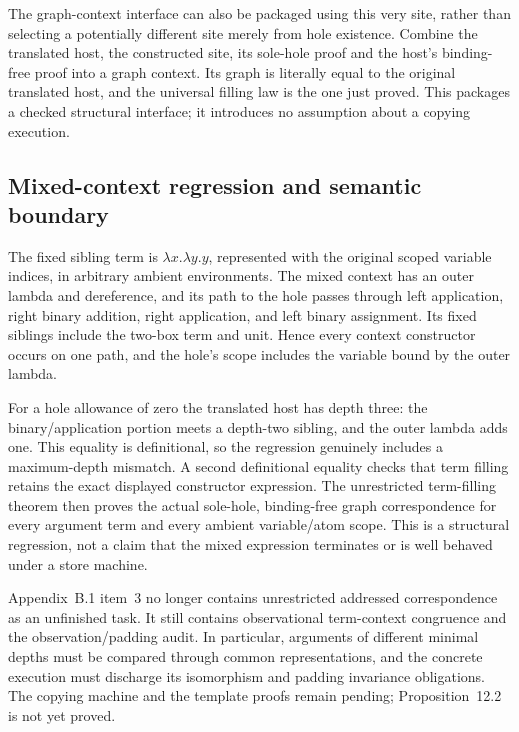 The graph-context interface can also be packaged using this very site, rather
than selecting a potentially different site merely from hole existence.
Combine the translated host, the constructed site, its sole-hole proof and
the host's binding-free proof into a graph context. Its graph is literally
equal to the original translated host, and the universal filling law is the
one just proved. This packages a checked structural interface; it introduces
no assumption about a copying execution.




\subsection{Mixed-context regression and semantic boundary}

The fixed sibling term is $\lambda x.\lambda y.y$, represented with the
original scoped variable indices, in arbitrary ambient environments. The
mixed context has an outer lambda and dereference, and its path to the hole
passes through left application, right binary addition, right application,
and left binary assignment. Its fixed siblings include the two-box term and
unit. Hence every context constructor occurs on one path, and the hole's
scope includes the variable bound by the outer lambda.

For a hole allowance of zero the translated host has depth three: the
binary/application portion meets a depth-two sibling, and the outer lambda
adds one. This equality is definitional, so the regression genuinely includes
a maximum-depth mismatch. A second definitional equality checks that term
filling retains the exact displayed constructor expression. The unrestricted
term-filling theorem then proves the actual sole-hole, binding-free graph
correspondence for every argument term and every ambient variable/atom scope.
This is a structural regression, not a claim that the mixed expression
terminates or is well behaved under a store machine.

Appendix~B.1 item~3 no longer contains unrestricted addressed correspondence
as an unfinished task. It still contains observational term-context congruence
and the observation/padding audit. In particular, arguments of different
minimal depths must be compared through common representations, and the
concrete execution must discharge its isomorphism and padding invariance
obligations. The copying machine and the template proofs remain pending;
Proposition~12.2 is not yet proved.


